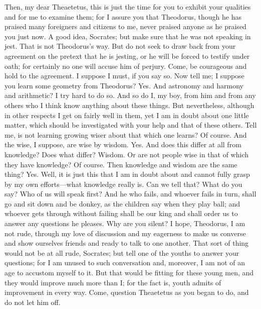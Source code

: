 \documentclass[letterpaper,12pt]{article}
\newcommand{\stephpag}[1]{\marginnote{\small\itshape\fontfamily{ppl}\selectfont #1}}
\begin{document}
\begin{drama}
Then, my dear Theaetetus, this is just the time for you to exhibit your qualities and for me to examine them; for I assure you that Theodorus, though he has praised many foreigners and citizens to me, never praised anyone as he praised you just now.
\theaetetusspeaks
A good idea, Socrates; but make sure \stephpag{c} that he was not speaking in jest.
\socratesspeaks
That is not Theodorus's way. But do not seek to draw back from your agreement on the pretext that he is jesting, or he will be forced to testify under oath; for certainly no one will accuse him of perjury. Come, be courageous and hold to the agreement.
\theaetetusspeaks
I suppose I must, if you say so.
\socratesspeaks
Now tell me; I suppose you learn some geometry from Theodorus?
\theaetetusspeaks
Yes. \stephpag{d}
\socratesspeaks
And astronomy and harmony and arithmetic?
\theaetetusspeaks
I try hard to do so.
\socratesspeaks
And so do I, my boy, from him and from any others who I think know anything about these things. But nevertheless, although in other respects I get on fairly well in them, yet I am in doubt about one little matter, which should be investigated with your help and that of these others. Tell me, is not learning growing wiser about that which one learns?
\theaetetusspeaks
Of course.
\socratesspeaks
And the wise, I suppose, are wise by wisdom.
\theaetetusspeaks
Yes. \stephpag{e}
\socratesspeaks
And does this differ at all from knowledge?
\theaetetusspeaks
Does what differ?
\socratesspeaks
Wisdom. Or are not people wise in that of which they have knowledge?
\theaetetusspeaks
Of course.
\socratesspeaks
Then knowledge and wisdom are the same thing?
\theaetetusspeaks
Yes.
\socratesspeaks
Well, it is just this that I am in doubt about and cannot fully grasp by my own efforts—what knowledge really is. \stephpag{146 a} Can we tell that? What do you say? Who of us will speak first? And he who fails, and whoever fails in turn, shall go and sit down and be donkey, as the children say when they play ball; and whoever gets through without failing shall be our king and shall order us to answer any questions he pleases. Why are you silent? I hope, Theodorus, I am not rude, through my love of discussion and my eagerness to make us converse and show ourselves friends and ready to talk to one another. \stephpag{b}
\theodorusspeaks
That sort of thing would not be at all rude, Socrates; but tell one of the youths to answer your questions; for I am unused to such conversation and, moreover, I am not of an age to accustom myself to it. But that would be fitting for these young men, and they would improve much more than I; for the fact is, youth admits of improvement in every way. Come, question Theaetetus as you began to do, and do not let him off.

\end{drama}
\end{document}
